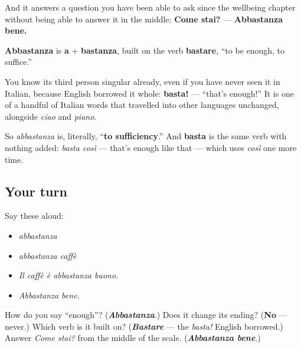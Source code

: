 And it answers a question you have been able to ask since the wellbeing chapter without being able to answer it in the middle: \textbf{Come stai?} — \textbf{Abbastanza bene.}

\begin{cousinweb}
\textbf{Abbastanza} is \textbf{a} + \textbf{bastanza}, built on the verb \textbf{bastare}, \textquotedblleft{}to be enough, to suffice.\textquotedblright{}

You know its third person singular already, even if you have never seen it in Italian, because English borrowed it whole: \textbf{basta!} — \textquotedblleft{}that's enough!\textquotedblright{} It is one of a handful of Italian words that travelled into other languages unchanged, alongside \emph{ciao} and \emph{piano}.

So \emph{abbastanza} is, literally, \textquotedblleft{}\textbf{to sufficiency}.\textquotedblright{} And \textbf{basta} is the same verb with nothing added: \emph{basta così} — that's enough like that — which uses \emph{così} one more time.
\end{cousinweb}

\subsection*{Your turn}
Say these aloud:

\begin{itemize}
\raggedright
  \item \emph{abbastanza}
  \item \emph{abbastanza caffè}
  \item \emph{Il caffè è abbastanza buono.}
  \item \emph{Abbastanza bene.}
\end{itemize}

\begin{tcolorbox}[breakable,colback=teal!4,colframe=teal!35!black,title={Before you move on}]
How do you say \textquotedblleft{}enough\textquotedblright{}? (\emph{\textbf{Abbastanza}}.) Does it change its ending? (\textbf{No} — never.) Which verb is it built on? (\emph{\textbf{Bastare}} — the \emph{basta!} English borrowed.) Answer \emph{Come stai?} from the middle of the scale. (\emph{\textbf{Abbastanza bene}}.)
\end{tcolorbox}
